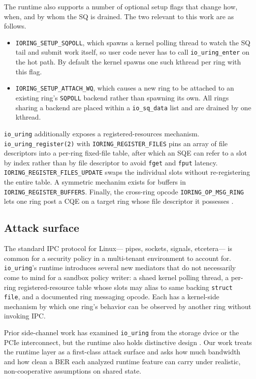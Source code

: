 \documentclass[letterpaper,twocolumn,10pt]{article}
\newcommand{\code}[1]{\texttt{#1}}
\newcommand{\iouring}{\texttt{io\_uring}\xspace}
\begin{document}
The runtime also supports a number of optional setup flags that change how, when, and by whom the SQ is drained. The two relevant to this work are as follows.
\begin{itemize}
    \item \code{IORING\_SETUP\_SQPOLL}, which spawns a kernel polling thread to watch the SQ tail and submit work itself, so user code never has to call \code{io\_uring\_enter} on the hot path. By default the kernel spawns one such kthread per ring with this flag.
    \item \code{IORING\_SETUP\_ATTACH\_WQ}, which causes a new ring to be attached to an existing ring's \code{SQPOLL} backend rather than spawning its own. All rings sharing a backend are placed within a \code{io\_sq\_data} list and are drained by one kthread.
\end{itemize}
\iouring additionally exposes a registered-resources mechanism. \code{io\_uring\_register(2)} with \code{IORING\_REGISTER\_FILES} pins an array of file descriptors into a per-ring fixed-file table, after which an SQE can refer to a slot by index rather than by file descriptor to avoid \code{fget} and \code{fput} latency. \code{IORING\_REGISTER\_FILES\_UPDATE} swaps the individual slots without re-registering the entire table. A symmetric mechanim exists for buffers in \code{IORING\_REGISTER\_BUFFERS}. Finally, the cross-ring opcode \code{IORING\_OP\_MSG\_RING} lets one ring post a CQE on a target ring whose file descriptor it possesses \cite{axboe_msg_ring}.

\subsection{Attack surface}
The standard IPC protocol for Linux--- pipes, sockets, signals, etcetera--- is common for a security policy in a multi-tenant environment to account for. \iouring's runtime introduces several new mediators that do not necessarily come to mind for a sandbox policy writer: a shaed kernel polling thread, a per-ring registered-resource table whose slots may alias to same backing \code{struct file}, and a documented ring messaging opcode. Each has a kernel-side mechanism by which one ring's behavior can be observed by another ring without invoking IPC.

Prior side-channel work has examined \iouring from the storage dvice or the PCIe interconnect, but the runtime also holds distinctive design \cite{juffinger2025secret}. Our work treats the runtime layer as a first-class attack surface and asks how much bandwidth and how clean a BER each analyzed runtime feature can carry under realistic, non-cooperative assumptions on shared state.
\end{document}
